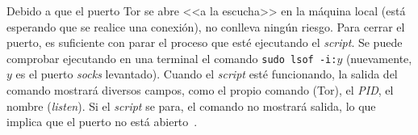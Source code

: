 Debido a que el puerto Tor se abre <<a la escucha>> en la máquina local (está esperando que se realice una conexión), no conlleva ningún riesgo. Para cerrar el puerto, es suficiente con parar el proceso que esté ejecutando el \textit{script}. Se puede comprobar ejecutando en una terminal el comando \texttt{sudo lsof -i:$y$} (nuevamente, $y$ es el puerto \textit{socks} levantado). Cuando el \textit{script} esté funcionando, la salida del comando mostrará diversos campos, como el propio comando (Tor), el \textit{PID}, el nombre (\textit{listen}). Si el \textit{script} se para, el comando no mostrará salida, lo que implica que el puerto no está abierto~\cite{checkOpenTorPorts}.